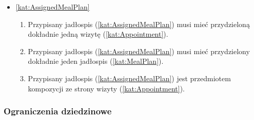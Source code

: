 \begin{itemize}[label={\textbf{Reguły dla}}, wide, labelwidth=!, labelindent=0pt]
    \item\ref{kat:AssignedMealPlan}\mynobreakpar
    \begin{enumerate}[label={\textbf{REG/5/\protect\twodigits{\arabic{enumi}}}}, wide, labelwidth=!, align=left, leftmargin=3cm, resume]
        \item Przypisany jadłospis (\ref{kat:AssignedMealPlan}) musi mieć przydzieloną dokładnie jedną wizytę (\ref{kat:Appointment}).
        \item Przypisany jadłospis (\ref{kat:AssignedMealPlan}) musi mieć przydzielony dokładnie jeden jadłospis (\ref{kat:MealPlan}).
        \item Przypisany jadłospis (\ref{kat:AssignedMealPlan}) jest przedmiotem kompozycji ze strony wizyty (\ref{kat:Appointment}).
    \end{enumerate}
\end{itemize}

\subsubsection{Ograniczenia dziedzinowe}\label{subsubsec:database:appointments:restrictions}

